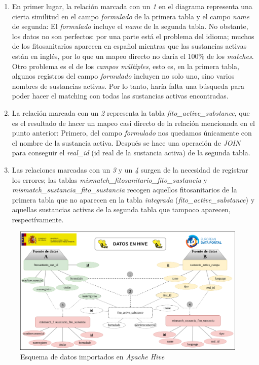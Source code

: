 \begin{enumerate}
\item En primer lugar, la relación marcada con un \textit{1} en el diagrama representa una cierta similitud en el campo \textit{formulado} de la primera tabla y el campo \textit{name} de segunda: El \textit{formulado} incluye el \textit{name} de la segunda tabla. No obstante, los datos no son perfectos: por una parte está el problema del idioma; muchos de los fitosanitarios aparecen en español mientras que las sustancias activas están en inglés, por lo que un mapeo directo no daría el 100\% de los \textit{matches}. Otro problema es el de los \textit{campos múltiples}, esto es, en la primera tabla, algunos registros del campo \textit{formulado} incluyen no solo uno, sino varios nombres de sustancias activas. Por lo tanto, haría falta una búsqueda para poder hacer el matching con todas las sustancias activas encontradas.
\item La relación marcada con un \textit{2} representa la tabla \textit{fito\_active\_substance}, que es el resultado de hacer un mapeo casi directo de la relación mencionada en el punto anterior: Primero, del campo \textit{formulado} nos quedamos únicamente con el nombre de la sustancia activa. Después se hace una operación de \textit{JOIN} para conseguir el \textit{real\_id} (id real de la sustancia activa) de la segunda tabla.
\item Las relaciones marcadas con un \textit{3} y un \textit{4} surgen de la necesidad de registrar los errores; las tablas \textit{mismatch\_fitosanitario\_fito\_sustancia} y \textit{mismatch\_sustancia\_fito\_sustancia} recogen aquellos fitosanitarios de la primera tabla que no aparecen en la tabla \textit{integrada} (\textit{fito\_active\_substance}) y aquellas sustancias activas de la segunda tabla que tampoco aparecen, respectívamente.
\end{enumerate}

\begin{landscape}
\begin{figure}[p!]
    \centering
    \includegraphics[width=\linewidth]{Imagenes/datoshive}
    \caption{Esquema de datos importados en \textit{Apache Hive}}
    \label{fig:datosApache Hive}
\end{figure}
\end{landscape}





